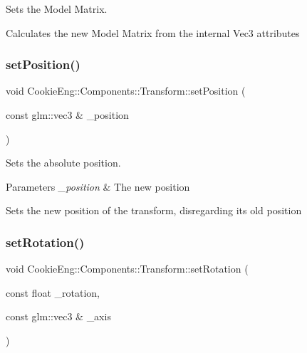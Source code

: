 Sets the Model Matrix. 

Calculates the new Model Matrix from the internal Vec3 attributes \mbox{\label{class_cookie_eng_1_1_components_1_1_transform_ac20843bb62dfdf7fce9fa96368b5a807}} 
\subsubsection{\texorpdfstring{set\+Position()}{setPosition()}}
{\footnotesize\ttfamily void Cookie\+Eng\+::\+Components\+::\+Transform\+::set\+Position (\begin{DoxyParamCaption}\item[{const glm\+::vec3 \&}]{\+\_\+position }\end{DoxyParamCaption})}



Sets the absolute position. 


\begin{DoxyParams}{Parameters}
{\em \+\_\+position} & The new position\\
\hline
\end{DoxyParams}
Sets the new position of the transform, disregarding its old position \mbox{\label{class_cookie_eng_1_1_components_1_1_transform_a382a16d437c34d7e345a60d11a9578b2}} 
\subsubsection{\texorpdfstring{set\+Rotation()}{setRotation()}}
{\footnotesize\ttfamily void Cookie\+Eng\+::\+Components\+::\+Transform\+::set\+Rotation (\begin{DoxyParamCaption}\item[{const float}]{\+\_\+rotation,  }\item[{const glm\+::vec3 \&}]{\+\_\+axis }\end{DoxyParamCaption})}



